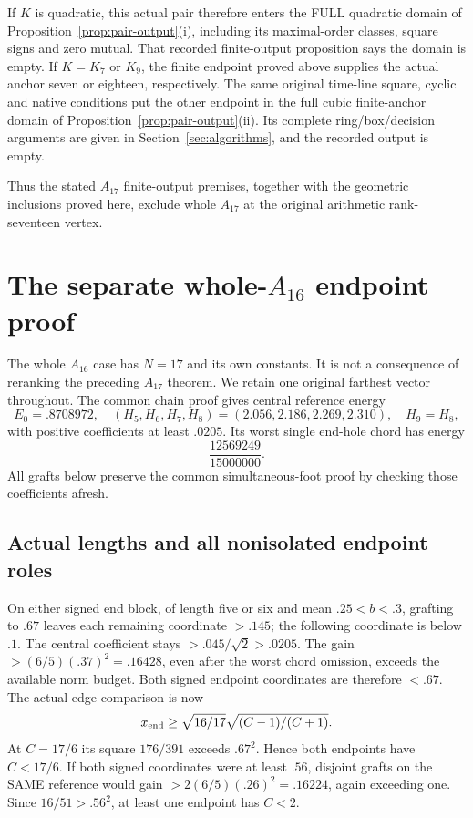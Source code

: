 \documentclass[11pt]{article}
\begin{document}
If \(K\) is quadratic, this actual pair therefore enters the FULL
quadratic domain of Proposition~\ref{prop:pair-output}(i),
including its maximal-order classes, square signs and zero mutual.
That recorded finite-output proposition says the domain is empty.
If \(K=K_7\) or \(K_9\), the finite endpoint proved above supplies
the actual anchor seven or eighteen, respectively.
The same original time-line square, cyclic and native conditions
put the other endpoint in the full cubic finite-anchor domain
of Proposition~\ref{prop:pair-output}(ii).
Its complete ring/box/decision arguments are given in
Section~\ref{sec:algorithms}, and the recorded output is empty.

Thus the stated \(A_{17}\) finite-output premises, together with the
geometric inclusions proved here, exclude whole \(A_{17}\) at the
original arithmetic rank-seventeen vertex.

\section[The separate whole-A16 endpoint proof]{The separate whole-\(A_{16}\) endpoint proof}
\label{app:wholearithA16}

The whole \(A_{16}\) case has \(N=17\) and its own constants.
It is not a consequence of reranking the preceding \(A_{17}\)
theorem.  We retain one original farthest vector throughout.
The common chain proof gives central reference energy
\[
 E_0=.8708972,\quad
 (H_5,H_6,H_7,H_8)=(2.056,2.186,2.269,2.310),\quad H_9=H_8,
\]
with positive coefficients at least \(.0205\).
Its worst single end-hole chord has energy
\[
                    \frac{12569249}{15000000}.
\]
All grafts below preserve the common simultaneous-foot proof
by checking those coefficients afresh.

\subsection{Actual lengths and all nonisolated endpoint roles}
\label{app:arithA16endpointlist}

On either signed end block, of length five or six and mean
\(.25<b<.3\), grafting to \(.67\) leaves each remaining
coordinate \(>.145\); the following coordinate is below \(.1\).
The central coefficient stays \(>.045/\sqrt2>.0205\).
The gain \(>(6/5)(.37)^2=.16428\), even after the worst
chord omission, exceeds the available norm budget.
Both signed endpoint coordinates are therefore \(<.67\).
The actual edge comparison is now
\[
 x_{\rm end}\ge\sqrt{16/17}\sqrt{(C-1)/(C+1)}.
\]
At \(C=17/6\) its square \(176/391\) exceeds \(.67^2\).
Hence both endpoints have \(C<17/6\).
If both signed coordinates were at least \(.56\), disjoint
grafts on the SAME reference would gain
\(>2(6/5)(.26)^2=.16224\), again exceeding one.
Since \(16/51>.56^2\), at least one endpoint has \(C<2\).
\end{document}
